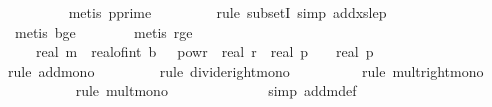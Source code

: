 \begin{isabellebody}
\ \ \ \ \ \ \ \ \isamarkupfalse%
\ {\isacharparenleft}{\kern0pt}metis\ p{\isacharunderscore}{\kern0pt}prime{\isacharparenright}{\kern0pt}\isanewline
\ \ \ \ \ \ \ \isamarkupfalse%
\ {\isacharparenleft}{\kern0pt}rule\ subsetI{\isacharcomma}{\kern0pt}\ simp\ add{\isacharcolon}{\kern0pt}xs{\isacharunderscore}{\kern0pt}le{\isacharunderscore}{\kern0pt}p{\isacharparenright}{\kern0pt}\isanewline
\ \ \ \ \ \ \ \isamarkupfalse%
\ {\isacharparenleft}{\kern0pt}\ metis\ b{\isacharunderscore}{\kern0pt}ge{\isacharunderscore}{\kern0pt}{}{\isacharparenright}{\kern0pt}\isanewline
\ \ \ \ \ \ \isamarkupfalse%
\ {\isacharparenleft}{\kern0pt}metis\ r{\isacharunderscore}{\kern0pt}ge{\isacharunderscore}{\kern0pt}{}{\isacharparenright}{\kern0pt}\isanewline
\ \ \ \ \isamarkupfalse%
\ \isamarkupfalse%
\ {\isachardoublequoteopen}{\isachardot}{\kern0pt}{\isachardot}{\kern0pt}{\isachardot}{\kern0pt}\ {\isasymle}\ {}\ {\isacharasterisk}{\kern0pt}\ {\isacharparenleft}{\kern0pt}real\ m{\isacharparenright}{\kern0pt}\ {\isacharasterisk}{\kern0pt}\ {\isacharparenleft}{\kern0pt}real{\isacharunderscore}{\kern0pt}of{\isacharunderscore}{\kern0pt}int\ b{\isacharparenright}{\kern0pt}\ {\isacharasterisk}{\kern0pt}\ {}\ powr\ {\isacharminus}{\kern0pt}\ real\ r\ {\isacharslash}{\kern0pt}\ {\isacharparenleft}{\kern0pt}real\ p{\isacharparenright}{\kern0pt}\ {\isacharplus}{\kern0pt}\ {}\ {\isacharslash}{\kern0pt}\ real\ p{\isachardoublequoteclose}\isanewline
\ \ \ \ \ \ \isamarkupfalse%
\ {\isacharparenleft}{\kern0pt}rule\ add{\isacharunderscore}{\kern0pt}mono{\isacharparenright}{\kern0pt}\isanewline
\ \ \ \ \ \ \ \isamarkupfalse%
\ {\isacharparenleft}{\kern0pt}rule\ divide{\isacharunderscore}{\kern0pt}right{\isacharunderscore}{\kern0pt}mono{\isacharparenright}{\kern0pt}\isanewline
\ \ \ \ \ \ \ \ \isamarkupfalse%
\ {\isacharparenleft}{\kern0pt}rule\ mult{\isacharunderscore}{\kern0pt}right{\isacharunderscore}{\kern0pt}mono{\isacharparenright}{\kern0pt}\isanewline
\ \ \ \ \ \ \ \ \ \isamarkupfalse%
\ {\isacharparenleft}{\kern0pt}rule\ mult{\isacharunderscore}{\kern0pt}mono{\isacharparenright}{\kern0pt}\isanewline
\ \ \ \ \ \ \ \ \ \ \ \ \isamarkupfalse%
\ {\isacharparenleft}{\kern0pt}simp\ add{\isacharcolon}{\kern0pt}m{\isacharunderscore}{\kern0pt}def{\isacharparenright}{\kern0pt}\isanewline

\end{isabellebody}
